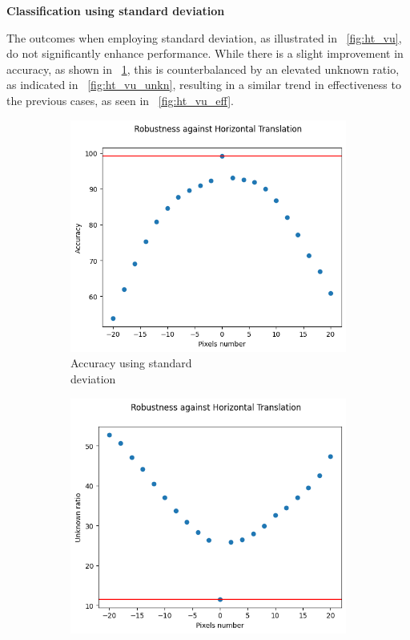 \vspace{0.3cm}
\textbf{Classification using standard deviation}
\vspace{0.1cm}

The outcomes when employing standard deviation, as illustrated in \Fig~\ref{fig:ht_vu}, do not significantly enhance performance. While there is a slight improvement in accuracy, as shown in \Fig~\ref{fig:ht_vu_acc}, this is counterbalanced by an elevated unknown ratio, as indicated in \Fig~\ref{fig:ht_vu_unkn}, resulting in a similar trend in effectiveness to the previous cases, as seen in \Fig~\ref{fig:ht_vu_eff}.

\begin{figure}[h]
	\centering
	\begin{subfigure}{.33\textwidth}
		\centering
		\includegraphics[width=0.9\linewidth]{ImageFiles/EvalBNN/HT/VU/acc}
		\caption{Accuracy using standard \\ deviation}
		\label{fig:ht_vu_acc}
	\end{subfigure}%
	\begin{subfigure}{.33\textwidth}
		\centering
		\includegraphics[width=0.9\linewidth]{ImageFiles/EvalBNN/HT/VU/unkn}

\end{subfigure}
\end{figure}
